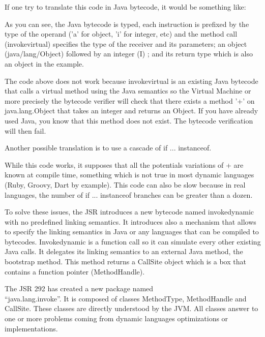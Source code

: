 \documentclass{sig-alternate}
\def \Jsr{JSR\xspace}
\def \JSR{\Jsr 292\xspace}
\def \JVM{JVM\xspace}
\begin{document}
      If one try to translate this code in Java bytecode, it would be something like:

      

      As you can see, the Java bytecode is typed, each instruction is prefixed 
      by the type of the operand ('a' for object, 'i' for integer, etc)
      and the method call (invokevirtual) specifies the type of the receiver and its parameters;
      an object (java/lang/Object) followed by an integer (I) ; and its return type
      which is also an object in the example.

      The code above does not work because invokevirtual is an existing Java bytecode that calls
      a virtual method using the Java semantics so the Virtual Machine or more precisely
      the bytecode verifier will check that there exists a method '+' on java.lang.Object
      that takes an integer and returns an Object. If you have already used Java, you know
      that this method does not exist. The bytecode verification will then fail.

      Another possible translation is to use a cascade of if ... instanceof.

      

      While this code works, it supposes that all the potentials variations of + are known at compile time,
      something which is not true in most dynamic languages (Ruby, Groovy, Dart by example).
      This code can also be slow because in real languages, the number of if ... instanceof branches
      can be greater than a dozen. 

      To solve these issues, the \Jsr introduces a new bytecode named invokedynamic with no predefined
      linking semantics. It introduces also a mechanism that allows to specify the linking semantics in Java
      or any languages that can be compiled to bytecodes.
      Invokedynamic is a function call so it can simulate every other existing Java calls.
      It delegates its linking semantics to an external Java method, the bootstrap method.
      This method returns a CallSite object which is a box that contains a function pointer (MethodHandle).

      The \JSR has created a new package named\\ ``java.lang.invoke''.
      It is composed of classes MethodType, MethodHandle and CallSite.
      These classes are directly understood by the \JVM.
      All classes answer to one or more problems coming from dynamic languages optimizations or implementations.
\end{document}

